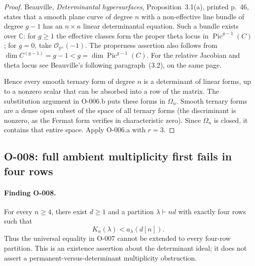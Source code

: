 \begin{proof}
Beauville, \emph{Determinantal hypersurfaces}, Proposition~3.1(a),
printed p.~46, states that a smooth plane curve of degree $n$ with
a non-effective line bundle of degree $g-1$ has an $n\times n$
linear determinantal equation. Such a bundle exists over $\mathbb C$:
for $g\geq1$ the effective classes form the proper theta locus in
$\operatorname{Pic}^{g-1}(C)$; for $g=0$, take
$\mathcal O_{\mathbb P^1}(-1)$. The properness assertion also follows
from $\dim C^{(g-1)}=g-1<g=\dim\operatorname{Pic}^{g-1}(C)$.
For the relative Jacobian and theta locus see Beauville's following
paragraph~(3.2), on the same page.

Hence every smooth ternary form of degree $n$ is a determinant of
linear forms, up to a nonzero scalar that can be absorbed into a row
of the matrix. The substitution argument in O-006.b puts these
forms in $\Omega_n$. Smooth ternary forms are a dense open subset
of the space of all ternary forms (the discriminant is nonzero, as
the Fermat form verifies in characteristic zero). Since $\Omega_n$
is closed, it contains that entire space. Apply O-006.a with $r=3$.
\end{proof}

\subsection{O-008: full ambient multiplicity first fails in four rows}

\paragraph{Finding O-008.}
For every $n\geq4$, there exist $d\geq1$ and a partition
$\lambda\vdash nd$ with exactly four rows such that
\[
                         K_n(\lambda)<a_\lambda(d[n]).   \tag{O-008.1}
\]
Thus the universal equality in O-007 cannot be extended to every
four-row partition. This is an existence assertion about the
determinant ideal; it does not assert a permanent-versus-determinant
multiplicity obstruction.

